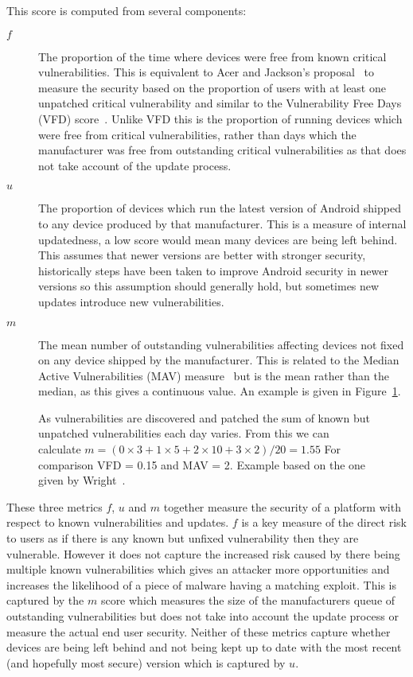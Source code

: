 This score is computed from several components:
\begin{description}
  \item[$f$] The proportion of the time where devices were free from known critical vulnerabilities. This is equivalent to Acer and Jackson's proposal~\cite{Acer2010} to measure the security based on the proportion of users with at least one unpatched critical vulnerability and similar to the Vulnerability Free Days (VFD) score~\cite{Wright2014}.
  Unlike VFD this is the proportion of running devices which were free from critical vulnerabilities, rather than days which the manufacturer was free from outstanding critical vulnerabilities as that does not take account of the update process.
  \item[$u$] The proportion of devices which run the latest version of Android shipped to any device produced by that manufacturer. This is a measure of internal updatedness, a low score would mean many devices are being left behind.
  This assumes that newer versions are better with stronger security, historically steps have been taken to improve Android security in newer versions so this assumption should generally hold, but sometimes new updates introduce new vulnerabilities.
  \item[$m$] The mean number of outstanding vulnerabilities affecting devices not fixed on any device shipped by the manufacturer. This is related to the Median Active Vulnerabilities (MAV) measure~\cite{Wright2014} but is the mean rather than the median, as this gives a continuous value.
  An example is given in Figure~\ref{fig:mcalculation}.
\end{description}

\begin{figure}
\centering

\caption{As vulnerabilities are discovered and patched the sum of known but unpatched vulnerabilities each day varies. From this we can calculate $m = (0 \times 3 + 1 \times 5 + 2 \times 10 + 3 \times 2) / 20 = 1.55$ For comparison VFD = 0.15 and MAV = 2. Example based on the one given by Wright~\cite{Wright2014}.}
\label{fig:mcalculation}
\end{figure}

These three metrics $f$, $u$ and $m$ together measure the security of a platform with respect to known vulnerabilities and updates.
$f$ is a key measure of the direct risk to users as if there is any known but unfixed vulnerability then they are vulnerable.
However it does not capture the increased risk caused by there being multiple known vulnerabilities which gives an attacker more opportunities and increases the likelihood of a piece of malware having a matching exploit.
This is captured by the $m$ score which measures the size of the manufacturers queue of outstanding vulnerabilities but does not take into account the update process or measure the actual end user security.
Neither of these metrics capture whether devices are being left behind and not being kept up to date with the most recent (and hopefully most secure) version which is captured by $u$.

